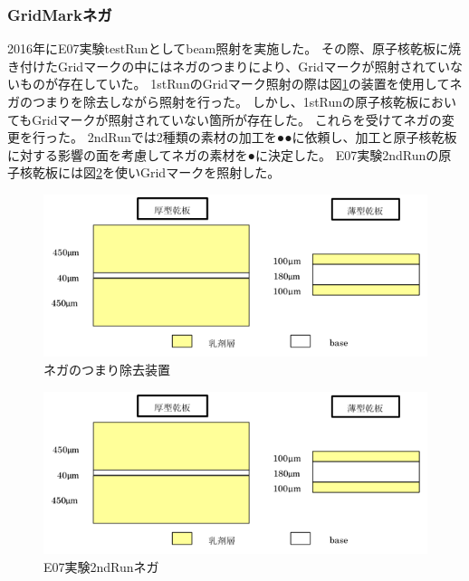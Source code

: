 \documentclass[12pt,a4paper]{jarticle}
\begin{document}
\subsubsection{GridMarkネガ}
2016年にE07実験testRunとしてbeam照射を実施した。
その際、原子核乾板に焼き付けたGridマークの中にはネガのつまりにより、Gridマークが照射されていないものが存在していた。
1stRunのGridマーク照射の際は図\ref{fig:nega_cleaner}の装置を使用してネガのつまりを除去しながら照射を行った。
しかし、1stRunの原子核乾板においてもGridマークが照射されていない箇所が存在した。
これらを受けてネガの変更を行った。
2ndRunでは2種類の素材の加工を●●に依頼し、加工と原子核乾板に対する影響の面を考慮してネガの素材を●に決定した。
E07実験2ndRunの原子核乾板には図\ref{fig:nega_2ndRun}を使いGridマークを照射した。
\begin{figure}[htbp]
  \centering
    \includegraphics[width=140mm]{emulsionorder.png}
  \caption{ネガのつまり除去装置\label{fig:nega_cleaner}}
\end{figure}
\begin{figure}[htbp]
  \centering
    \includegraphics[width=140mm]{emulsionorder.png}
  \caption{E07実験2ndRunネガ\label{fig:nega_2ndRun}}
\end{figure}
\end{document}
